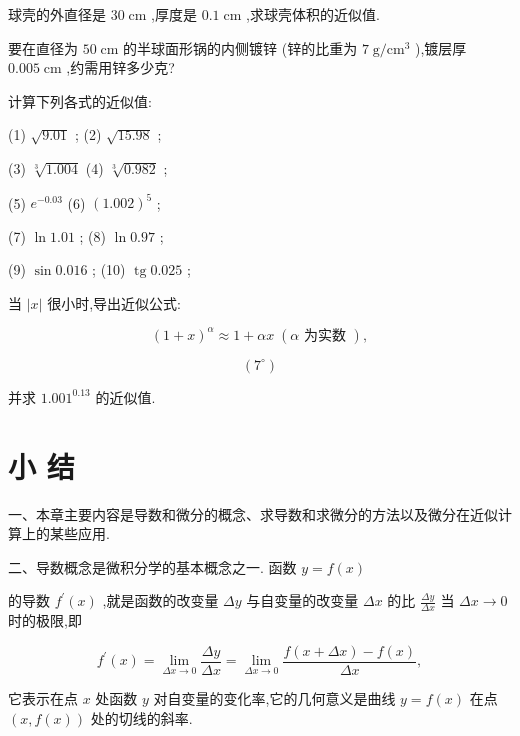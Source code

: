 \documentclass[lang=cn,newtx,10pt,scheme=chinese]{elegantbook}
\begin{document}
\begin{problemset}[习 题 八]
\item 球壳的外直径是 \({30}\mathrm{\;{cm}}\) ,厚度是 \({0.1}\mathrm{\;{cm}}\) ,求球壳体积的近似值.

\item 要在直径为 \({50}\mathrm{\;{cm}}\) 的半球面形锅的内侧镀锌 (锌的比重为 \(7\mathrm{\;g}/{\mathrm{{cm}}}^{3}\) ),镀层厚 \({0.005}\mathrm{\;{cm}}\) ,约需用锌多少克?

\item 计算下列各式的近似值:

(1) \(\sqrt{9.01}\) ; (2) \(\sqrt{15.98}\) ;

(3) \(\sqrt[3]{1.004}\) (4) \(\sqrt[3]{0.982}\) ;

(5) \({e}^{-{0.03}}\) (6) \({\left( {1.002}\right) }^{5}\) ;

(7) \(\ln {1.01}\) ; (8) \(\ln {0.97}\) ;

(9) \(\sin {0.016}\) ; (10) \(\operatorname{tg}{0.025}\) ;

\item 当 \(\left| x\right|\) 很小时,导出近似公式:

\[
{\left( 1 + x\right) }^{\alpha } \approx 1 + {\alpha x}\;\left( {\alpha \text{ 为实数 }}\right) ,
\]

\[
\left( {7}^{ \circ }\right)
\]

并求 \({1.001}^{0.13}\) 的近似值.

\end{problemset}

\chapter*{小 结}

一、本章主要内容是导数和微分的概念、求导数和求微分的方法以及微分在近似计算上的某些应用.

二、导数概念是微积分学的基本概念之一. 函数 \(y = f\left( x\right)\)

的导数 \({f}^{\prime }\left( x\right)\) ,就是函数的改变量 \({\Delta y}\) 与自变量的改变量 \({\Delta x}\) 的比 \(\frac{\Delta y}{\Delta x}\) 当 \({\Delta x} \rightarrow 0\) 时的极限,即

\[
{f}^{\prime }\left( x\right) = \mathop{\lim }\limits_{{{\Delta x} \rightarrow 0}}\frac{\Delta y}{\Delta x} = \mathop{\lim }\limits_{{{\Delta x} \rightarrow 0}}\frac{f\left( {x + {\Delta x}}\right) - f\left( x\right) }{\Delta x},
\]

它表示在点 \(x\) 处函数 \(y\) 对自变量的变化率,它的几何意义是曲线 \(y = f\left( x\right)\) 在点 \(\left( {x,f\left( x\right) }\right)\) 处的切线的斜率.
\end{document}

